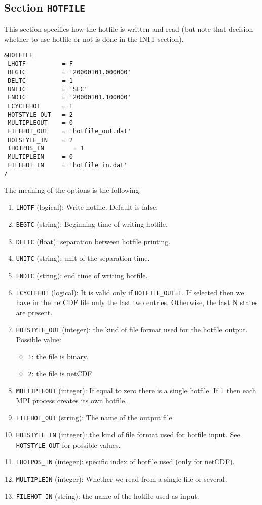 \documentclass[12pt]{amsart}
\begin{document}
\newpage

\subsection{Section {\tt HOTFILE}}
This section specifies how the hotfile is written and read (but note that decision whether to use hotfile or not is done in the INIT section).

\begin{verbatim}
&HOTFILE
 LHOTF          = F
 BEGTC          = '20000101.000000' 
 DELTC          = 1     
 UNITC          = 'SEC' 
 ENDTC          = '20000101.100000' 
 LCYCLEHOT      = T
 HOTSTYLE_OUT   = 2
 MULTIPLEOUT    = 0
 FILEHOT_OUT    = 'hotfile_out.dat' 
 HOTSTYLE_IN    = 2 
 IHOTPOS_IN        = 1
 MULTIPLEIN     = 0 
 FILEHOT_IN     = 'hotfile_in.dat'
/
\end{verbatim}
The meaning of the options is the following:
\begin{enumerate}
\item {\tt LHOTF} (logical): Write hotfile. Default is false.
\item {\tt BEGTC} (string): Beginning time of writing hotfile.
\item {\tt DELTC} (float): separation between hotfile printing.
\item {\tt UNITC} (string): unit of the separation time.
\item {\tt ENDTC} (string): end time of writing hotfile.
\item {\tt LCYCLEHOT} (logical): It is valid only if {\tt HOTFILE\_OUT=T}. If selected then we have in the netCDF file only the last two entries. Otherwise, the last N states are present.
\item {\tt HOTSTYLE\_OUT} (integer): the kind of file format used for the hotfile output. Possible value:
  \begin{itemize}
  \item {\tt 1}: the file is binary.
  \item {\tt 2}: the file is netCDF
  \end{itemize}
\item {\tt MULTIPLEOUT} (integer): If equal to zero there is a single hotfile. If 1 then each MPI process creates its own hotfile.
\item {\tt FILEHOT\_OUT} (string): The name of the output file.
\item {\tt HOTSTYLE\_IN} (integer): the kind of file format used for hotfile input. See {\tt HOTSTYLE\_OUT} for possible values.
\item {\tt IHOTPOS\_IN} (integer): specific index of hotfile used (only for netCDF).
\item {\tt MULTIPLEIN} (integer): Whether we read from a single file or several.
\item {\tt FILEHOT\_IN} (string): the name of the hotfile used as input.
\end{enumerate}
\end{document}
